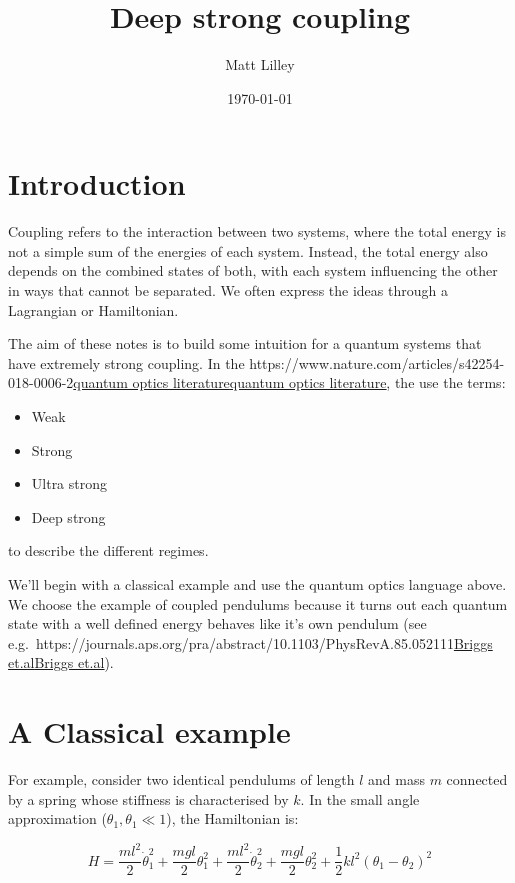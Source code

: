 \documentclass[
]{article}
\title{Deep strong coupling}
\author{Matt Lilley}
\date{\today}  %
\let\oldhref\href
\renewcommand{\href}[2]{\ifx#1\urlprefix\oldhref{#1}{#2}\else\uline{\oldhref{#1}{#2}}\fi}
\renewcommand{\[}{\begin{equation}}
\renewcommand{\]}{\end{equation}}
\providecommand{\tightlist}{%
  \setlength{\itemsep}{0pt}\setlength{\parskip}{0pt}}
\begin{document}
\maketitle

\section{Introduction}\label{introduction}

Coupling refers to the interaction between two systems, where the total
energy is not a simple sum of the energies of each system. Instead, the
total energy also depends on the combined states of both, with each
system influencing the other in ways that cannot be separated. We often
express the ideas through a Lagrangian or Hamiltonian.

The aim of these notes is to build some intuition for a quantum systems
that have extremely strong coupling. In the
\href{https://www.nature.com/articles/s42254-018-0006-2}{quantum optics
literature}, the use the terms:

\begin{itemize}
\tightlist
\item
  Weak
\item
  Strong
\item
  Ultra strong
\item
  Deep strong
\end{itemize}

to describe the different regimes.

We'll begin with a classical example and use the quantum optics language
above. We choose the example of coupled pendulums because it turns out
each quantum state with a well defined energy behaves like it's own
pendulum (see
e.g.~\href{https://journals.aps.org/pra/abstract/10.1103/PhysRevA.85.052111}{Briggs
et.al}).

\section{A Classical example}\label{a-classical-example}

For example, consider two identical pendulums of length \(l\) and mass
\(m\) connected by a spring whose stiffness is characterised by \(k\).
In the small angle approximation (\(\theta_1, \theta_1 \ll 1\)), the
Hamiltonian is:

\[
H = \frac{m l^2}{2} \dot{\theta}_1^2 + \frac{m g l}{2} \theta_1^2 + \frac{m l^2}{2} \dot{\theta}_2^2 + \frac{m g l}{2} \theta_2^2 + \frac{1}{2} k l^2(\theta_1 - \theta_2)^2
\]
\end{document}
